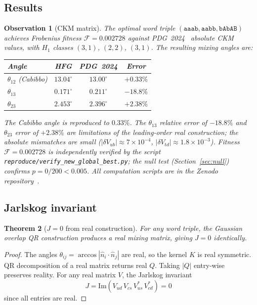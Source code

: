 \documentclass[11pt,a4paper]{article}
\newtheorem{theorem}{Theorem}
\newtheorem{observation}[theorem]{Observation}
\theoremstyle{remark}
\begin{document}
\subsection{Results}

\begin{observation}[CKM matrix]
\label{obs:ckm}
The optimal word triple $(\mathtt{aaab}, \mathtt{aabb}, \mathtt{bAbAB})$
achieves Frobenius fitness $\mathcal{F} = 0.002728$ against PDG~2024~\cite{PDG2024}
absolute CKM values, with $H_1$ classes $(3,1)$, $(2,2)$, $(3,1)$.
The resulting mixing angles are:

\begin{center}
\begin{tabular}{lccc}
\toprule
Angle & HFG & PDG~2024 & Error \\
\midrule
$\theta_{12}$ (Cabibbo) & $13.04^\circ$ & $13.00^\circ$ & $+0.33\%$ \\
$\theta_{13}$ & $0.171^\circ$ & $0.211^\circ$ & $-18.8\%$ \\
$\theta_{23}$ & $2.453^\circ$ & $2.396^\circ$ & $+2.38\%$ \\
\bottomrule
\end{tabular}
\end{center}

The Cabibbo angle is reproduced to $0.33\%$.
The $\theta_{13}$ relative error of $-18.8\%$ and $\theta_{23}$ error of $+2.38\%$
are limitations of the leading-order real construction;
the absolute mismatches are small ($|\delta V_{ub}| \approx 7\times 10^{-4}$,
$|\delta V_{td}| \approx 1.8\times 10^{-3}$).
Fitness $\mathcal{F} = 0.002728$ is independently verified by the script
\texttt{reproduce/verify\_new\_global\_best.py}; the null test
(Section~\ref{sec:null}) confirms $p = 0/200 < 0.005$.
All computation scripts are in the Zenodo repository~\cite{Gentry:zenodo}.
\end{observation}

\subsection{Jarlskog invariant}

\begin{theorem}[$J=0$ from real construction]
\label{thm:jarlskog}
For any word triple, the Gaussian overlap QR construction produces a
real mixing matrix, giving $J = 0$ identically.
\end{theorem}

\begin{proof}\sloppy
The angles $\theta_{ij} = \arccos|\hat{n}_i \cdot \hat{n}_j|$ are real,
so the kernel $K$ is real symmetric.
QR decomposition of a real matrix returns real $Q$.
Taking $|Q|$ entry-wise preserves reality.
For any real matrix $V$, the Jarlskog invariant
\[
J = \mathrm{Im}(V_{ud}\,V_{cs}\,V^*_{us}\,V^*_{cd}) = 0
\]
since all entries are real.
\fussy\end{proof}
\end{document}
